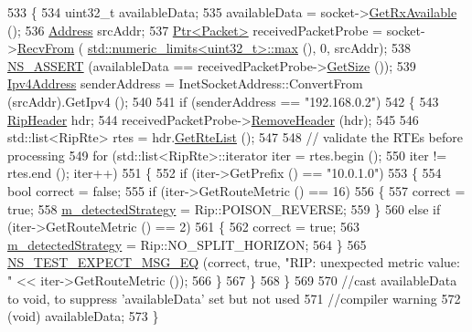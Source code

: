 \begin{DoxyCode}
533 \{
534   uint32\_t availableData;
535   availableData = socket->\hyperlink{classns3_1_1Socket_ad35d8931e53ae0754ee864acb1cecd0e}{GetRxAvailable} ();
536   \hyperlink{classns3_1_1Address}{Address} srcAddr;
537   \hyperlink{classns3_1_1Ptr}{Ptr<Packet>} receivedPacketProbe = socket->\hyperlink{classns3_1_1Socket_af22378d7af9a2745a9eada20210da215}{RecvFrom} (
      \hyperlink{80211b_8c_affe776513b24d84b39af8ab0930fef7f}{std::numeric\_limits<uint32\_t>::max} (), 0, srcAddr);
538   \hyperlink{assert_8h_a6dccdb0de9b252f60088ce281c49d052}{NS\_ASSERT} (availableData == receivedPacketProbe->\hyperlink{classns3_1_1Packet_a462855c9929954d4301a4edfe55f4f1c}{GetSize} ());
539   \hyperlink{classns3_1_1Ipv4Address}{Ipv4Address} senderAddress = InetSocketAddress::ConvertFrom (srcAddr).GetIpv4 ();
540 
541   \textcolor{keywordflow}{if} (senderAddress == \textcolor{stringliteral}{"192.168.0.2"})
542     \{
543       \hyperlink{classns3_1_1RipHeader}{RipHeader} hdr;
544       receivedPacketProbe->\hyperlink{classns3_1_1Packet_a0961eccf975d75f902d40956c93ba63e}{RemoveHeader} (hdr);
545 
546       std::list<RipRte> rtes = hdr.\hyperlink{classns3_1_1RipHeader_a4046f3c5a7a1308e1529bc738a7e58ce}{GetRteList} ();
547 
548       \textcolor{comment}{// validate the RTEs before processing}
549       \textcolor{keywordflow}{for} (std::list<RipRte>::iterator iter = rtes.begin ();
550           iter != rtes.end (); iter++)
551         \{
552           \textcolor{keywordflow}{if} (iter->GetPrefix () == \textcolor{stringliteral}{"10.0.1.0"})
553             \{
554               \textcolor{keywordtype}{bool} correct = \textcolor{keyword}{false};
555               \textcolor{keywordflow}{if} (iter->GetRouteMetric () == 16)
556                 \{
557                   correct = \textcolor{keyword}{true};
558                   \hyperlink{classIpv4RipSplitHorizonStrategyTest_a5d6aa772524fbfc3865b823a5076a502}{m\_detectedStrategy} = Rip::POISON\_REVERSE;
559                 \}
560               \textcolor{keywordflow}{else} \textcolor{keywordflow}{if} (iter->GetRouteMetric () == 2)
561                 \{
562                   correct = \textcolor{keyword}{true};
563                   \hyperlink{classIpv4RipSplitHorizonStrategyTest_a5d6aa772524fbfc3865b823a5076a502}{m\_detectedStrategy} = Rip::NO\_SPLIT\_HORIZON;
564                 \}
565               \hyperlink{group__testing_ga7304ba46a28d8cf08dfdfd6499cf7068}{NS\_TEST\_EXPECT\_MSG\_EQ} (correct, \textcolor{keyword}{true}, \textcolor{stringliteral}{"RIP: unexpected metric value: "} 
      << iter->GetRouteMetric ());
566             \}
567         \}
568     \}
569 
570   \textcolor{comment}{//cast availableData to void, to suppress 'availableData' set but not used}
571   \textcolor{comment}{//compiler warning}
572   (void) availableData;
573 \}
\end{DoxyCode}



